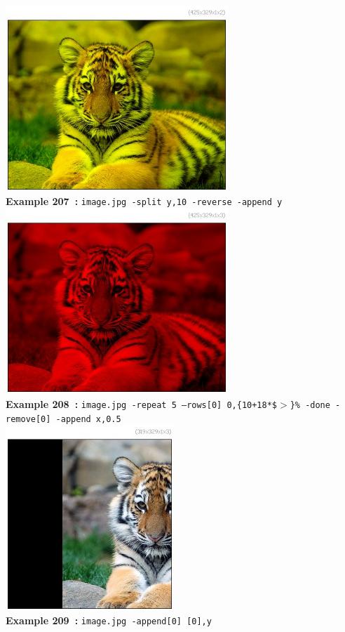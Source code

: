 \documentclass[a4paper,11pt,twoside]{book}
\begin{document}
\begin{center}\includegraphics[keepaspectratio=true,height=7cm,width=\textwidth]{img/gmic_def207.jpg}\\
{\footnotesize \textbf{Example 207~:} \texttt{image.jpg -split y,10 -reverse -append y}}
\\\includegraphics[keepaspectratio=true,height=7cm,width=\textwidth]{img/gmic_def208.jpg}\\
{\footnotesize \textbf{Example 208~:} \texttt{image.jpg -repeat 5 --rows[0] 0,\{10+18*\$$>$\}\% -done -remove[0] -append x,0.5}}
\\\includegraphics[keepaspectratio=true,height=7cm,width=\textwidth]{img/gmic_def209.jpg}\\
{\footnotesize \textbf{Example 209~:} \texttt{image.jpg -append[0] [0],y}}
\end{center}
\end{document}
